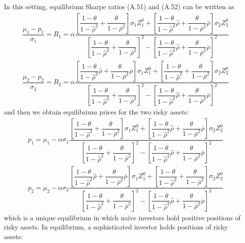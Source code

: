 \documentclass[10pt]{article}
\begin{document}
In this setting, equilibrium Sharpe ratios (A.51) and (A.52) can be written as
\begin{eqnarray*}
& \dfrac{\mu_1 - p_1}{\sigma_1} = R_1 = \alpha \dfrac{\left[ \dfrac{1 - \theta}{1 - {\hat \rho}^2} + \dfrac{\theta}{1 - \overline{\rho}^2} \right] \sigma_1 Z_1^0 + \left[ \dfrac{1 - \theta}{1 - {\hat \rho}^2} {\hat \rho} + \dfrac{\theta}{1 - \overline{\rho}^2} \overline{\rho} \right] \sigma_2 Z_2^0}{\left[ \dfrac{1 - \theta}{1 - {\hat \rho}^2} + \dfrac{\theta}{1 - \overline{\rho}^2} \right]^2 - \left[ \dfrac{1 - \theta}{1 - {\hat \rho}^2} {\hat \rho} + \dfrac{\theta}{1 - \overline{\rho}^2} \overline{\rho} \right]^2} & \\
& \dfrac{\mu_2 - p_2}{\sigma_2} = R_2 = \alpha \dfrac{\left[ \dfrac{1 - \theta}{1 - {\hat \rho}^2} {\hat \rho} + \dfrac{\theta}{1 - \overline{\rho}^2} \overline{\rho} \right] \sigma_1 Z_1^0 + \left[ \dfrac{1 - \theta}{1 - {\hat \rho}^2} + \dfrac{\theta}{1 - \overline{\rho}^2} \right] \sigma_2 Z_2^0}{\left[ \dfrac{1 - \theta}{1 - {\hat \rho}^2} + \dfrac{\theta}{1 - \overline{\rho}^2} \right]^2 - \left[ \dfrac{1 - \theta}{1 - {\hat \rho}^2} {\hat \rho} + \dfrac{\theta}{1 - \overline{\rho}^2} \overline{\rho} \right]^2} &
\end{eqnarray*}
and then we obtain equilibrium prices for the two risky assets:
\begin{eqnarray}
& p_1 = \mu_1 - \alpha \sigma_1 \dfrac{\left[ \dfrac{1 - \theta}{1 - {\hat \rho}^2} + \dfrac{\theta}{1 - \overline{\rho}^2} \right] \sigma_1 Z_1^0 + \left[ \dfrac{1 - \theta}{1 - {\hat \rho}^2} {\hat \rho} + \dfrac{\theta}{1 - \overline{\rho}^2} \overline{\rho} \right] \sigma_2 Z_2^0}{\left[ \dfrac{1 - \theta}{1 - {\hat \rho}^2} + \dfrac{\theta}{1 - \overline{\rho}^2} \right]^2 - \left[ \dfrac{1 - \theta}{1 - {\hat \rho}^2} {\hat \rho} + \dfrac{\theta}{1 - \overline{\rho}^2} \overline{\rho} \right]^2} & \\
& p_2 = \mu_2 - \alpha \sigma_2 \dfrac{\left[ \dfrac{1 - \theta}{1 - {\hat \rho}^2} {\hat \rho} + \dfrac{\theta}{1 - \overline{\rho}^2} \overline{\rho} \right] \sigma_1 Z_1^0 + \left[ \dfrac{1 - \theta}{1 - {\hat \rho}^2} + \dfrac{\theta}{1 - \overline{\rho}^2} \right] \sigma_2 Z_2^0}{\left[ \dfrac{1 - \theta}{1 - {\hat \rho}^2} + \dfrac{\theta}{1 - \overline{\rho}^2} \right]^2 - \left[ \dfrac{1 - \theta}{1 - {\hat \rho}^2} {\hat \rho} + \dfrac{\theta}{1 - \overline{\rho}^2} \overline{\rho} \right]^2} &
\end{eqnarray}
which is a unique equilibrium in which na\"ive investors hold positive positions of risky assets. In equilibrium, a sophisticated investor holds positions of risky assets:
\end{document}
